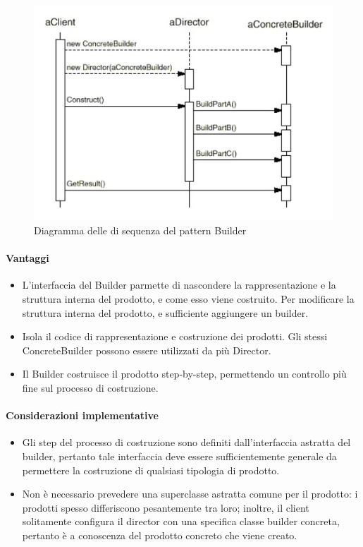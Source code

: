 \begin{figure}[h!]
  \centering
  \includegraphics[scale=0.55]{imgs/builder_sd.jpg}
  \caption{Diagramma delle di sequenza del pattern Builder}
\end{figure}

\paragraph{Vantaggi}
\label{par:vantaggi}

\begin{itemize}
    \item L'interfaccia del Builder parmette di nascondere la rappresentazione e
    la struttura interna del prodotto, e come esso viene costruito.
    Per modificare la struttura interna del prodotto, e sufficiente
    aggiungere un builder.
    \item Isola il codice di rappresentazione e costruzione dei prodotti. Gli
    stessi ConcreteBuilder possono essere utilizzati da più Director.
    \item Il Builder costruisce il prodotto step-by-step, permettendo un
    controllo più fine sul processo di costruzione.
\end{itemize}

\paragraph{Considerazioni implementative}
\label{par:considerazioni_implementative}

\begin{itemize}
    \item Gli step del processo di costruzione sono definiti dall'interfaccia
    astratta del builder, pertanto tale interfaccia deve essere sufficientemente
    generale da permettere la costruzione di qualsiasi tipologia di prodotto.
    \item Non è necessario prevedere una superclasse astratta comune per il
    prodotto: i prodotti spesso differiscono pesantemente tra loro; inoltre, il
    client solitamente configura il director con una specifica classe builder
    concreta, pertanto è a conoscenza del prodotto concreto che viene creato.
\end{itemize}
